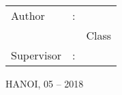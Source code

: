 \begin{titlepage}
\begin{center}
		\vspace{40pt}

		\raggedleft
		\begin{minipage}{0.6\linewidth}
			\fontsize{14}{16pt}\selectfont
			\begin{tabular}{ l c l }
			Author & : & \textbf{\thesisAuthor}\\
					& & Class \studentClass\\
			Supervisor & : & \textbf{\supervisor}
			\end{tabular}
		\end{minipage}
		\vfill
		\centering
		\fontsize{16}{16pt}\selectfont
		\MakeUppercase{Hanoi, 05 -- 2018}
	\end{center}
	\cleardoublepage
\end{titlepage}